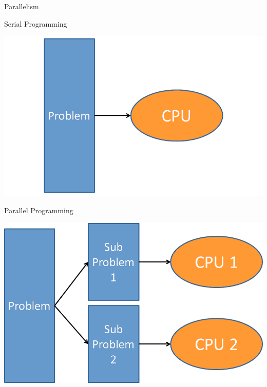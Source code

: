 \begin{frame}
  \begin{block}{Parallelism}\pause
    \begin{center}
    \begin{minipage}{.46\textwidth}
    \begin{block}{\centering Serial Programming}
      \begin{center}
      \includegraphics[width=.975\textwidth]{pics/parallelism1}
      \end{center}
      \end{block}
    \end{minipage}
    \hspace{.15cm}
    \begin{minipage}{.46\textwidth}
    \begin{block}{\centering Parallel Programming}
      \begin{center}
      \includegraphics[width=.975\textwidth]{pics/parallelism2}
      \end{center}
      \end{block}
    \end{minipage}
    \end{center}
  \end{block}
\end{frame}

